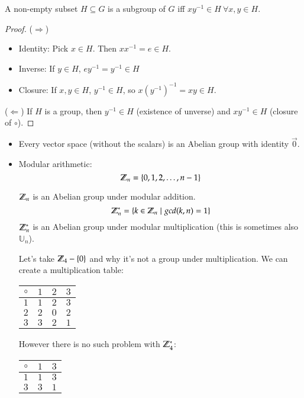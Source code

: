 \begin{proposition}
A non-empty subset $H\subseteq G$ is a subgroup of $G$ iff $xy^{-1}\in H\ \forall x, y\in H$. 
\end{proposition}
\begin{proof}
($\Rightarrow$) 
\begin{itemize}
	\item Identity: Pick $x\in H$. Then $xx^{-1}=e\in H$. 
	\item Inverse: If $y\in H$, $ey^{-1}=y^{-1}\in H$
	\item Closure: If $x, y\in H$, $y^{-1}\in H$, so $x(y^{-1})^{-1}=xy\in H$. 
\end{itemize}

($\Leftarrow$) If $H$ is a group, then $y^{-1}\in H$ (existence of unverse) and $xy^{-1}\in H$ (closure of $\circ$). 
\end{proof}

\example
\begin{itemize}
\item Every vector space (without the scalars) is an Abelian group with identity $\vec{0}$. 
\item Modular arithmetic: 
\[\mathbb{Z}_n = \{0, 1, 2, \dots, n-1\}\]

$\mathbb{Z}_n$ is an Abelian group under modular addition. 
\[\mathbb{Z}_n^*=\{k\in \mathbb{Z}_n\mid gcd(k, n) = 1\}\]
$\mathbb{Z}_n^*$ is an Abelian group under modular multiplication (this is sometimes also $\mathbb{U}_n$).

Let's take $\mathbb{Z}_4 - \{0\}$ and why it's not a group under multiplication. We can create a multiplication table: 
\begin{center}
\begin{tabular}{c|ccc}
$\circ$ & $1$ & $2$ & $3$ \\ \hline
$1$     & $1$ & $2$ & $3$ \\
$2$     & $2$ & $0$ & $2$ \\
$3$     & $3$ & $2$ & $1$
\end{tabular}
\end{center}

However there is no such problem with $\mathbb{Z}_4^*$: 
\begin{center}
\begin{tabular}{c|cc}
$\circ$ & $1$ & $3$ \\ \hline
$1$     & $1$ & $3$ \\
$3$     & $3$ & $1$
\end{tabular}
\end{center}
\end{itemize}

